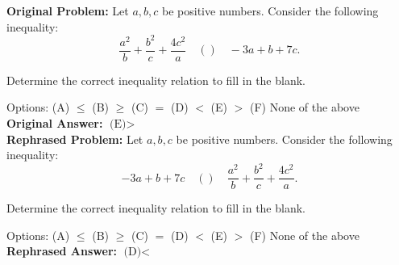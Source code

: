 \begin{examplebox}

\textbf{Original Problem:} Let $a, b, c$ be positive numbers. Consider the following inequality:
$$
\frac{a^2}{b} + \frac{b^2}{c} + \frac{4c^2}{a} \quad () \quad -3a + b + 7c.
$$

Determine the correct inequality relation to fill in the blank.

Options: (A) $\leq$ \quad(B) $\geq$ \quad (C) $=$  \quad (D) $<$ \quad  (E) $>$  \quad (F) None of the above\\

\textbf{Original Answer:} $\boxed{\text{(E)} >}$ \\

\textbf{Rephrased Problem:}  Let $a, b, c$ be positive numbers. Consider the following inequality:
$$
 -3a + b + 7c  \quad () \quad\frac{a^2}{b} + \frac{b^2}{c} + \frac{4c^2}{a}.
$$

Determine the correct inequality relation to fill in the blank.

Options: (A) $\leq$ \quad(B) $\geq$ \quad (C) $=$  \quad (D) $<$ \quad  (E) $>$  \quad (F) None of the above\\

\textbf{Rephrased Answer:}  $\boxed{\text{(D)} <}$

\end{examplebox}